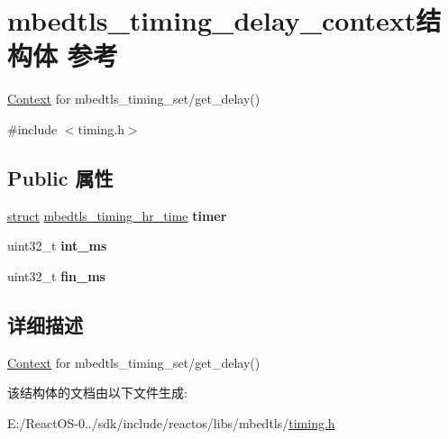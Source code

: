 \hypertarget{structmbedtls__timing__delay__context}{}\section{mbedtls\+\_\+timing\+\_\+delay\+\_\+context结构体 参考}
\label{structmbedtls__timing__delay__context}


\hyperlink{struct_context}{Context} for mbedtls\+\_\+timing\+\_\+set/get\+\_\+delay()  




{\ttfamily \#include $<$timing.\+h$>$}

\subsection*{Public 属性}
\begin{DoxyCompactItemize}
\item 
\mbox{\label{structmbedtls__timing__delay__context_abf629e677a656c08a5aa3e5ba0cbf2d5}} 
\hyperlink{interfacestruct}{struct} \hyperlink{structmbedtls__timing__hr__time}{mbedtls\+\_\+timing\+\_\+hr\+\_\+time} {\bfseries timer}
\item 
\mbox{\label{structmbedtls__timing__delay__context_a9887c5bc1eb16059afbc163052ca1cb8}} 
uint32\+\_\+t {\bfseries int\+\_\+ms}
\item 
\mbox{\label{structmbedtls__timing__delay__context_af31d3fb6212e38581dbe3b97afc45f55}} 
uint32\+\_\+t {\bfseries fin\+\_\+ms}
\end{DoxyCompactItemize}


\subsection{详细描述}
\hyperlink{struct_context}{Context} for mbedtls\+\_\+timing\+\_\+set/get\+\_\+delay() 

该结构体的文档由以下文件生成\+:\begin{DoxyCompactItemize}
\item 
E\+:/\+React\+O\+S-\/0../sdk/include/reactos/libs/mbedtls/\hyperlink{timing_8h}{timing.\+h}\end{DoxyCompactItemize}
